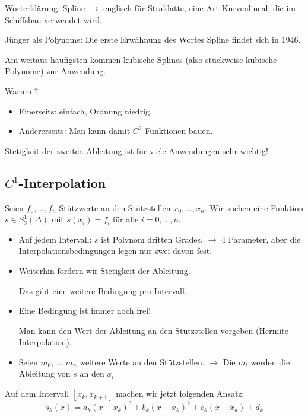 \underline{Worterklärung:} Spline $\rightarrow$ englisch für \glqq Straklatte\grqq, eine Art Kurvenlineal, die im Schiffsbau verwendet wird.

\medskip

Jünger als Polynome: Die erste Erwähnung des Wortes \glqq Spline\grqq{} findet sich in 1946.\newline

Am weitaus häufigsten kommen kubische Splines (also stückweise kubische Polynome) zur Anwendung.

Warum ? 
\begin{itemize}
  \item Einerseits: einfach, Ordnung niedrig.
  \item Andererseits: Man kann damit $C^2$-Funktionen bauen.
\end{itemize}

Stetigkeit der zweiten Ableitung ist für viele Anwendungen sehr wichtig!


\subsection{$C^1$-Interpolation}

Seien $f_0, \dots, f_n$ Stützwerte an den Stützstellen $x_0, \dots, x_n$. Wir suchen eine Funktion $s \in S^1_3(\Delta)$ mit $s(x_i) = f_i$ für alle $i=0,\dots, n$.
\begin{itemize}
  \item Auf jedem Intervall: $s$ ist Polynom dritten Grades. \newline
  $\rightarrow$ 4 Parameter, aber die Interpolationsbedingungen legen nur zwei davon fest.

  \item Weiterhin fordern wir Stetigkeit der Ableitung.

   Das gibt eine weitere Bedingung pro Intervall.

  \item Eine Bedingung ist immer noch frei!

  Man kann den Wert der Ableitung an den Stützstellen vorgeben (Hermite-Interpolation).

  \item Seien $m_0, \dots, m_n$ weitere Werte an den Stützstellen.\newline
  $\rightarrow$ Die $m_i$ werden die Ableitung von $s$ an den $x_i$
\end{itemize}

Auf dem Intervall $\left[x_k, x_{k+1}\right]$ machen wir jetzt folgenden Ansatz: 
\[ s_k(x)= a_k(x-x_k)^3 + b_k(x-x_k)^2 + c_k(x-x_k) + d_k\]

